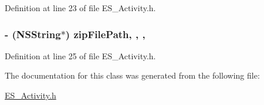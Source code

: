 Definition at line 23 of file E\+S\+\_\+\+Activity.\+h.

\hypertarget{interface_e_s___activity_ad428e875c7511ddbc1b3df65bdabeef7}{
\subsubsection[{zip\+File\+Path}]{\setlength{\rightskip}{0pt plus 5cm}-\/ (N\+S\+String$\ast$) zip\+File\+Path\hspace{0.3cm}{\ttfamily [read]}, {\ttfamily [write]}, {\ttfamily [nonatomic]}, {\ttfamily [retain]}}}\label{interface_e_s___activity_ad428e875c7511ddbc1b3df65bdabeef7}


Definition at line 25 of file E\+S\+\_\+\+Activity.\+h.



The documentation for this class was generated from the following file\+:\begin{DoxyCompactItemize}
\item 
\hyperlink{_e_s___activity_8h}{E\+S\+\_\+\+Activity.\+h}\end{DoxyCompactItemize}
